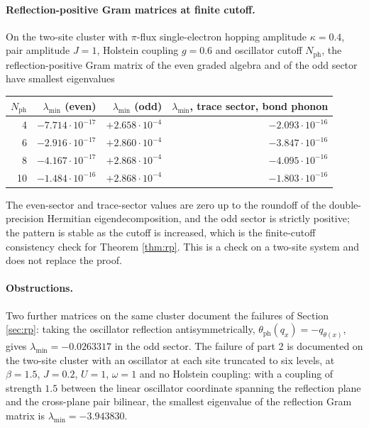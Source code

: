 \documentclass[11pt]{article}
\numberwithin{equation}{section}
\newcommand{\ph}{\mathrm{ph}}
\newcommand{\fN}{N_{\mathrm{ph}}}
\theoremstyle{definition}
\begin{document}
\paragraph{Reflection-positive Gram matrices at finite cutoff.}
On the two-site cluster with $\pi$-flux single-electron hopping amplitude $\kappa=0.4$, pair amplitude $J=1$,
Holstein coupling $g=0.6$ and oscillator cutoff $\fN$, the reflection-positive Gram matrix
of the even graded algebra and of the odd sector have smallest eigenvalues

\begin{center}
\begin{tabular}{@{}rrrr@{}}
\toprule
$\fN$ & $\lambda_{\min}$ (even) & $\lambda_{\min}$ (odd) & $\lambda_{\min}$, trace sector, bond phonon\\
\midrule
4 & $-7.714\cdot10^{-17}$ & $+2.658\cdot10^{-4}$ & $-2.093\cdot10^{-16}$\\
6 & $-2.916\cdot10^{-17}$ & $+2.860\cdot10^{-4}$ & $-3.847\cdot10^{-16}$\\
8 & $-4.167\cdot10^{-17}$ & $+2.868\cdot10^{-4}$ & $-4.095\cdot10^{-16}$\\
10 & $-1.484\cdot10^{-16}$ & $+2.868\cdot10^{-4}$ & $-1.803\cdot10^{-16}$\\
\bottomrule
\end{tabular}
\end{center}

The even-sector and trace-sector values are zero up to the roundoff of the
double-precision Hermitian eigendecomposition, and the odd sector is strictly positive;
the pattern is stable as the cutoff is increased, which is the finite-cutoff
consistency check for Theorem \ref{thm:rp}. This is a check on a two-site system and does
not replace the proof.

\paragraph{Obstructions.}
Two further matrices on the same cluster document the failures of Section \ref{sec:rp}:
taking the oscillator reflection antisymmetrically, $\theta_{\ph}(q_{x})=-q_{\theta(x)}$,
gives $\lambda_{\min}=-0.0263317$ in the odd sector. The failure of part 2 is documented
on the two-site cluster with an oscillator at each site truncated to six levels, at
$\beta=1.5$, $J=0.2$, $U=1$, $\omega=1$ and no Holstein coupling: with a coupling of
strength $1.5$ between the linear oscillator coordinate spanning the reflection plane and
the cross-plane pair bilinear, the smallest eigenvalue of the reflection Gram matrix is
$\lambda_{\min}=-3.943830$.
\end{document}
